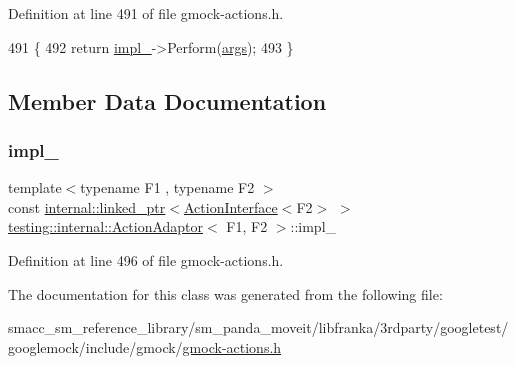 Definition at line 491 of file gmock-\/actions.\+h.


\begin{DoxyCode}
491                                                     \{
492     \textcolor{keywordflow}{return} \hyperlink{classtesting_1_1internal_1_1ActionAdaptor_a555b8bc3e770b9a0d824be1ee2403783}{impl\_}->Perform(\hyperlink{namespacegenerate__debs_a75f9143e38df82d83b2e8a6f99cae02c}{args});
493   \}
\end{DoxyCode}


\subsection{Member Data Documentation}
\mbox{\label{classtesting_1_1internal_1_1ActionAdaptor_a555b8bc3e770b9a0d824be1ee2403783}} 
\subsubsection{\texorpdfstring{impl\+\_\+}{impl\_}}
{\footnotesize\ttfamily template$<$typename F1 , typename F2 $>$ \\
const \hyperlink{classtesting_1_1internal_1_1linked__ptr}{internal\+::linked\+\_\+ptr}$<$\hyperlink{classtesting_1_1ActionInterface}{Action\+Interface}$<$F2$>$ $>$ \hyperlink{classtesting_1_1internal_1_1ActionAdaptor}{testing\+::internal\+::\+Action\+Adaptor}$<$ F1, F2 $>$\+::impl\+\_\+\hspace{0.3cm}{\ttfamily [private]}}



Definition at line 496 of file gmock-\/actions.\+h.



The documentation for this class was generated from the following file\+:\begin{DoxyCompactItemize}
\item 
smacc\+\_\+sm\+\_\+reference\+\_\+library/sm\+\_\+panda\+\_\+moveit/libfranka/3rdparty/googletest/googlemock/include/gmock/\hyperlink{gmock-actions_8h}{gmock-\/actions.\+h}\end{DoxyCompactItemize}
